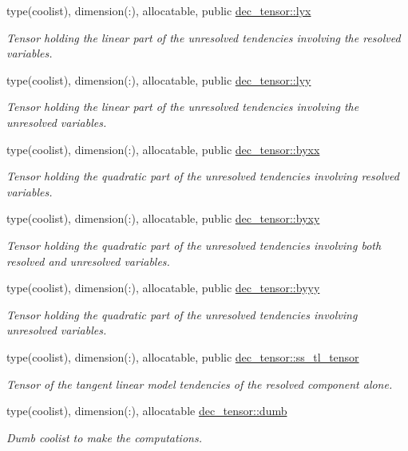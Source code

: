 \begin{DoxyCompactItemize}
type(coolist), dimension(\+:), allocatable, public \hyperlink{namespacedec__tensor_aed1ce57179fc836a3c439d8c3da85049}{dec\+\_\+tensor\+::lyx}
\begin{DoxyCompactList}\small\item\em Tensor holding the linear part of the unresolved tendencies involving the resolved variables. \end{DoxyCompactList}\item 
type(coolist), dimension(\+:), allocatable, public \hyperlink{namespacedec__tensor_a0b44998c712bdb9adad15a6bc4df8022}{dec\+\_\+tensor\+::lyy}
\begin{DoxyCompactList}\small\item\em Tensor holding the linear part of the unresolved tendencies involving the unresolved variables. \end{DoxyCompactList}\item 
type(coolist), dimension(\+:), allocatable, public \hyperlink{namespacedec__tensor_adb81ce421da8f2b1c972c63ccdce6214}{dec\+\_\+tensor\+::byxx}
\begin{DoxyCompactList}\small\item\em Tensor holding the quadratic part of the unresolved tendencies involving resolved variables. \end{DoxyCompactList}\item 
type(coolist), dimension(\+:), allocatable, public \hyperlink{namespacedec__tensor_a7c84cc16c29566626a9b6a47dde529f2}{dec\+\_\+tensor\+::byxy}
\begin{DoxyCompactList}\small\item\em Tensor holding the quadratic part of the unresolved tendencies involving both resolved and unresolved variables. \end{DoxyCompactList}\item 
type(coolist), dimension(\+:), allocatable, public \hyperlink{namespacedec__tensor_ae146ffac640fe6d4dc52fb31f2c78956}{dec\+\_\+tensor\+::byyy}
\begin{DoxyCompactList}\small\item\em Tensor holding the quadratic part of the unresolved tendencies involving unresolved variables. \end{DoxyCompactList}\item 
type(coolist), dimension(\+:), allocatable, public \hyperlink{namespacedec__tensor_a5e65ad7fdc3a92172a2e45341284fc6b}{dec\+\_\+tensor\+::ss\+\_\+tl\+\_\+tensor}
\begin{DoxyCompactList}\small\item\em Tensor of the tangent linear model tendencies of the resolved component alone. \end{DoxyCompactList}\item 
type(coolist), dimension(\+:), allocatable \hyperlink{namespacedec__tensor_a63c533216b73ee87a50205bfa5adecea}{dec\+\_\+tensor\+::dumb}
\begin{DoxyCompactList}\small\item\em Dumb coolist to make the computations. \end{DoxyCompactList}\end{DoxyCompactItemize}

